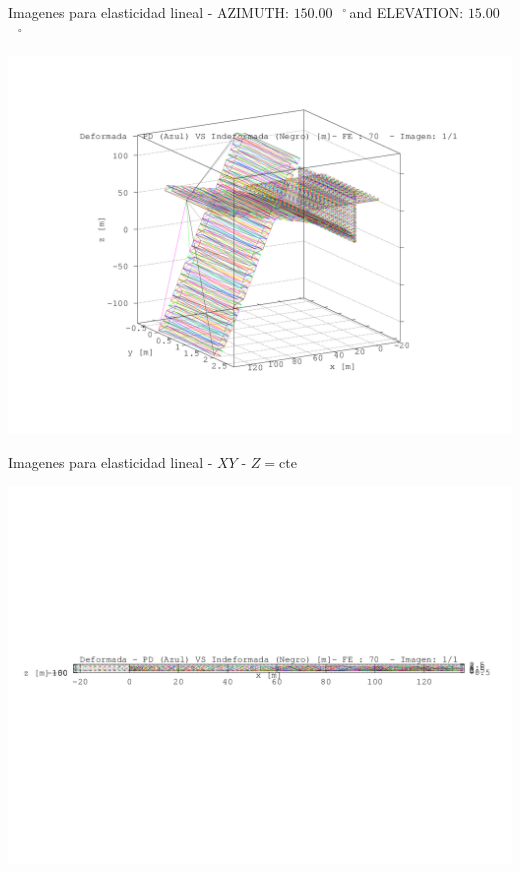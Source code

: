 \documentclass[a4paper,11pt]{article}
\newcommand{\grad}{\hspace{-2.5mm}$\,\phantom{a}^{\circ}\,$}
\begin{document}
\newpage       
\begin{center}       
Imagenes para elasticidad lineal - AZIMUTH: $150.00$\grad and ELEVATION: $ 15.00$\grad

\includegraphics[width=.80\textwidth]{../grua_deformada_1.png}      

\end{center}       
\newpage       
\begin{center}       
Imagenes para elasticidad lineal -  $XY$ - $Z=\text{cte}$ 

\includegraphics[width=.80\textwidth]{../../XY_XZ_YZ/XY/deformada/grua_deformada_XY_1.png}      

\end{center}       
\newpage       
\end{document}
